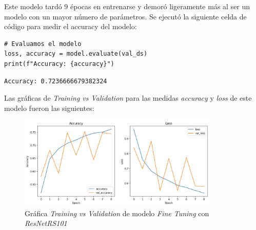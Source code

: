 Este modelo tardó 9 épocas en entrenarse y demoró ligeramente más al ser un modelo con un mayor número de parámetros. Se ejecutó la siguiente celda de código para medir el accuracy del modelo: 


\begin{lstlisting}[caption={Código para la impresión del \textit{accuracy} del modelo}]
# Evaluamos el modelo
loss, accuracy = model.evaluate(val_ds)
print(f"Accuracy: {accuracy}")
\end{lstlisting}


\begin{lstlisting}[caption={Impresión \textit{accuracy} del modelo}]
Accuracy: 0.7236666679382324
\end{lstlisting}

Las gráficas de \textit{Training vs Validation} para las medidas \textit{accuracy} y \textit{loss} de este modelo fueron las siguientes:

\begin{figure}[H]
    \centering
    \includegraphics[width=0.85\textwidth]{Francisco/Imagenes resultados/TvsCNN4.png} 
    \caption{Gráfica \textit{Training vs Validation} de modelo \textit{Fine Tuning} con \textit{ResNetRS101}}
\end{figure}


